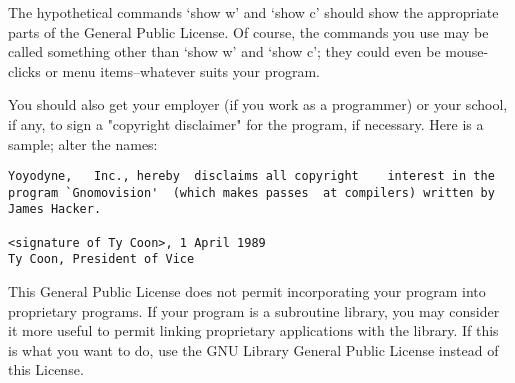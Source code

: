 The  hypothetical commands `show   w'  and `show   c' should  show the
appropriate  parts of the  General   Public License.  Of course,   the
commands you use may be called something other than `show w' and `show
c'; they could even be mouse-clicks or menu items--whatever suits your
program.

You should  also get  your employer (if  you work  as a programmer) or
your school, if any, to sign a "copyright disclaimer" for the program,
if necessary.  Here is a sample; alter the names:

\begin{verbatim}
Yoyodyne,   Inc., hereby  disclaims all copyright    interest in the
program `Gnomovision'  (which makes passes  at compilers) written by
James Hacker.

<signature of Ty Coon>, 1 April 1989
Ty Coon, President of Vice
\end{verbatim}

This General Public License does not permit incorporating your program
into proprietary programs.  If your program is a subroutine library,
you may consider it more useful to permit linking proprietary
applications with the library.  If this is what you want to do, use
the GNU Library General Public License instead of this License.

\newpage
